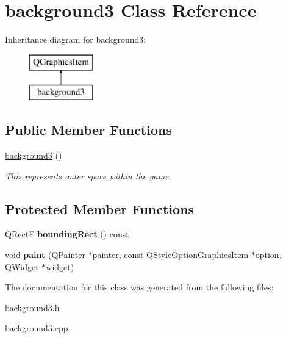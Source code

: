 \hypertarget{classbackground3}{\section{background3 Class Reference}
\label{classbackground3}
}
Inheritance diagram for background3\-:\begin{figure}[H]
\begin{center}
\leavevmode
\includegraphics[height=2.000000cm]{classbackground3}
\end{center}
\end{figure}
\subsection*{Public Member Functions}
\begin{DoxyCompactItemize}
\item 
\hypertarget{classbackground3_a742028d653682b5e7227967f84f8025b}{\hyperlink{classbackground3_a742028d653682b5e7227967f84f8025b}{background3} ()}\label{classbackground3_a742028d653682b5e7227967f84f8025b}

\begin{DoxyCompactList}\small\item\em This represents outer space within the game. \end{DoxyCompactList}\end{DoxyCompactItemize}
\subsection*{Protected Member Functions}
\begin{DoxyCompactItemize}
\item 
\hypertarget{classbackground3_a6dad89c5a92e1564e36bdf6e795d725f}{Q\-Rect\-F {\bfseries bounding\-Rect} () const }\label{classbackground3_a6dad89c5a92e1564e36bdf6e795d725f}

\item 
\hypertarget{classbackground3_ab17c347405b194fb860d0f036e78f22d}{void {\bfseries paint} (Q\-Painter $\ast$painter, const Q\-Style\-Option\-Graphics\-Item $\ast$option, Q\-Widget $\ast$widget)}\label{classbackground3_ab17c347405b194fb860d0f036e78f22d}

\end{DoxyCompactItemize}


The documentation for this class was generated from the following files\-:\begin{DoxyCompactItemize}
\item 
background3.\-h\item 
background3.\-cpp\end{DoxyCompactItemize}
